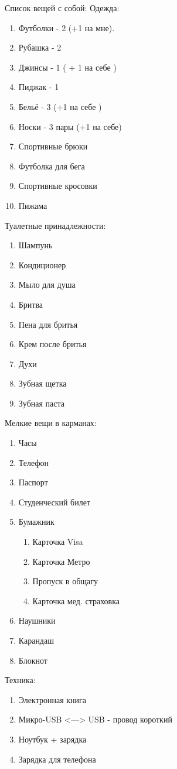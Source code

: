 \documentclass[a4paper, 11pt]{article}
\begin{document}
Список вещей с собой:
Одежда:
\begin{enumerate}
    \item Футболки - 2 (+1 на мне).
    \item Рубашка - 2
    \item Джинсы  - 1 ( + 1 на себе )
    \item Пиджак - 1
    \item Бельё - 3 (+1 на себе )
    \item Носки - 3 пары (+1 на себе)
    \item Спортивные брюки
    \item Футболка для бега
    \item Спортивные кросовки
    \item Пижама
\end{enumerate}

Туалетные принадлежности:
\begin{enumerate}
    \item Шампунь
    \item Кондиционер
    \item Мыло для душа
    \item Бритва
    \item Пена для бритья
    \item Крем после бритья
    \item Духи
    \item Зубная щетка
    \item Зубная паста
\end{enumerate}

Мелкие вещи в карманах:
\begin{enumerate}
    \item Часы
    \item Телефон
    \item Паспорт
    \item Студенческий билет
    \item Бумажник\
    \begin{enumerate}
        \item Карточка Visa
        \item Карточка Метро
        \item Пропуск в общагу
        \item Карточка мед. страховка
    \end{enumerate}
    \item Наушники
    \item Карандаш
    \item Блокнот
\end{enumerate}

Техника:
\begin{enumerate}
    \item Электронная книга
    \item Микро-USB <---> USB - провод короткий
    \item Ноутбук + зарядка
    \item Зарядка для телефона
\end{enumerate}
\end{document}
